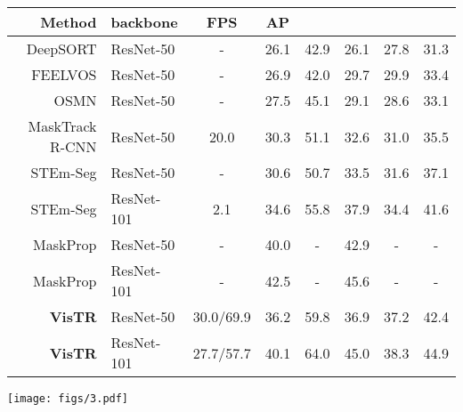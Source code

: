 \documentclass[final]{cvpr}
\def\Ours{{VisTR}\xspace}
\begin{document}
{\begin{table*}
\small 
\centering 
\begin{tabular}{ r|l|c|c|cccc}
 Method&backbone& FPS& AP &  &  &  &  \\
\hline
DeepSORT\cite{wojke2017simple}&ResNet-50&-&26.1&42.9&26.1&27.8&31.3\\
FEELVOS\cite{voigtlaender2019feelvos}&ResNet-50&-&26.9&42.0&29.7&29.9&33.4\\
OSMN\cite{yang2018efficient}&ResNet-50&-&27.5&45.1&29.1&28.6&33.1\\
MaskTrack R-CNN\cite{vis2019}&ResNet-50&20.0&30.3&51.1&32.6&31.0&35.5\\
STEm-Seg\cite{Athar_Mahadevan20ECCV}&ResNet-50&-&30.6&50.7&33.5&31.6&37.1\\
STEm-Seg\cite{Athar_Mahadevan20ECCV}&ResNet-101&2.1&34.6&55.8&37.9&34.4&41.6\\
MaskProp\cite{bertasius2020classifying}&ResNet-50&-&40.0&-&42.9&-&-\\
MaskProp\cite{bertasius2020classifying}&ResNet-101&-&42.5&-&45.6&-&-\\
\hline
\textbf{\Ours}&ResNet-50&30.0/69.9&36.2&59.8&36.9&37.2&42.4\\
\textbf{\Ours}&ResNet-101&27.7/57.7&40.1&64.0&45.0&38.3&44.9\\
\end{tabular}
\caption{\textbf{Video instance segmentation} AP (\%) on the YouTube-VIS \cite{vis2019} validation dataset. Note that,
for the first three methods, we have cited the results reported by the re-implementations in \cite{vis2019} for VIS. Other results are adopted from their original paper.
For the speed of \Ours we report the FPS results with and without the data loading process. 
Here we naively load the images serially, taking unnecessarily long time.
The data loading process can be much faster by parallelizing.
}
\label{tab:sota}
\vspace{-0.4cm}
\end{table*}

\begin{figure*}[h]
\centering
\texttt{[image: figs/3.pdf]}
\caption{\textbf{Visualization of \Ours} on the YouTube-VIS \cite{vis2019} validation dataset. Each row contains images from the same video. For each video, here the same colors 
depict the mask sequences of the same instances (Best viewed on screen).
}
\label{fig:3}
\vspace{-0.5cm}
\end{figure*}


}
\end{document}

